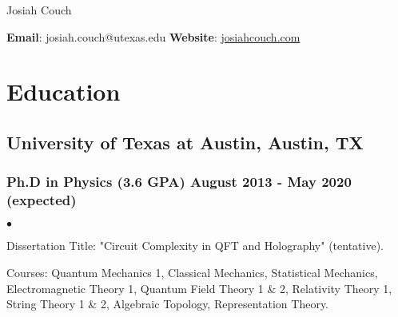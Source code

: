 \documentclass[letterpaper]{article}
\def\name{Josiah Couch}
\renewenvironment{itemize}{
  \begin{list}{$\bullet$}{
    \setlength{\itemsep}{0em}
    \setlength{\parskip}{0em}
    \setlength{\parsep}{0em} 
    \setlength{\topsep}{0em} 
  }
}{
  \end{list}
}
\begin{document}

\centerline{\LARGE \name}

\begin{center}

\small{\textbf{Email}: josiah.couch@utexas.edu \textbf{Website}: \url{josiahcouch.com}}

\end{center}

\section*{Education}

\subsection*{University of Texas at Austin, Austin, TX}
\subsubsection*{Ph.D in Physics (3.6 GPA) \hfill August 2013 - May 2020 (expected)}

\begin{itemize}
\item Dissertation Title: "Circuit Complexity in QFT and Holography" (tentative).

\item Courses: Quantum Mechanics 1, Classical Mechanics, Statistical Mechanics, Electromagnetic Theory 1, Quantum Field Theory 1 \& 2, Relativity Theory 1, String Theory 1 \& 2, Algebraic Topology, Representation Theory.
\end{itemize}


\end{document}
